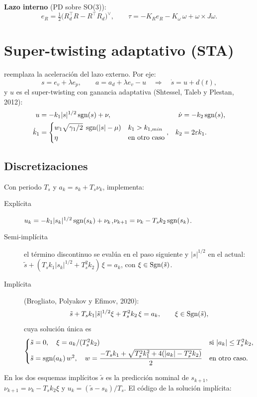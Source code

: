 \textbf{Lazo interno} (PD sobre SO(3)):
\begin{equation}
e_R = \tfrac12\big(R_d^\top R - R^\top R_d\big)^\vee,\qquad
\tau = -K_R e_R - K_\omega\,\omega + \omega\times J\omega .
\end{equation}

\section{Super-twisting adaptativo (STA)}

 reemplaza la aceleración del lazo externo. Por eje:
\begin{equation}
s = e_v + \lambda e_p,\qquad a = a_d + \lambda e_v - u
\quad\Rightarrow\quad \dot s = u + d(t),
\end{equation}
y $u$ es el super-twisting con ganancia adaptativa (Shtessel, Taleb y Plestan, 2012):
\begin{align}
u &= -k_1 |s|^{1/2}\operatorname{sgn}(s) + \nu, & \dot\nu &= -k_2\operatorname{sgn}(s),\\
\dot k_1 &= \begin{cases} w_1\sqrt{\gamma_1/2}\;\operatorname{sgn}(|s|-\mu) & k_1 > k_{1,min}\\ \eta & \text{en otro caso}\end{cases},
& k_2 &= 2\varepsilon k_1 .
\end{align}

\subsection{Discretizaciones}
\label{sec:discretizaciones}

Con periodo $T_s$ y $a_k = s_k + T_s\nu_k$,  implementa:

\begin{description}
  \item[Explícita] $u_k = -k_1|s_k|^{1/2}\operatorname{sgn}(s_k) + \nu_k$,\quad $\nu_{k+1} = \nu_k - T_s k_2\operatorname{sgn}(s_k)$.
  \item[Semi-implícita] el término discontinuo se evalúa en el paso siguiente y $|s|^{1/2}$ en el actual:
        $\tilde s + (T_s k_1|s_k|^{1/2} + T_s^2 k_2)\,\xi = a_k$, con $\xi\in\operatorname{Sgn}(\tilde s)$.
  \item[Implícita] (Brogliato, Polyakov y Efimov, 2020):
  \begin{equation}
  \tilde s + T_s k_1|\tilde s|^{1/2}\xi + T_s^2 k_2\,\xi = a_k,\qquad \xi\in\operatorname{Sgn}(\tilde s),
  \end{equation}
  cuya solución única es
  \begin{equation}
  \begin{cases}
  \tilde s = 0,\quad \xi = a_k/(T_s^2k_2) & \text{si } |a_k|\le T_s^2k_2,\\[2pt]
  \tilde s = \operatorname{sgn}(a_k)\,w^2,\quad w = \dfrac{-T_sk_1+\sqrt{T_s^2k_1^2+4(|a_k|-T_s^2k_2)}}{2} & \text{en otro caso.}
  \end{cases}
  \end{equation}
\end{description}
En los dos esquemas implícitos $\tilde s$ es la predicción nominal de $s_{k+1}$, $\nu_{k+1} = \nu_k
- T_s k_2\xi$ y $u_k = (\tilde s - s_k)/T_s$. El código de la solución implícita:

